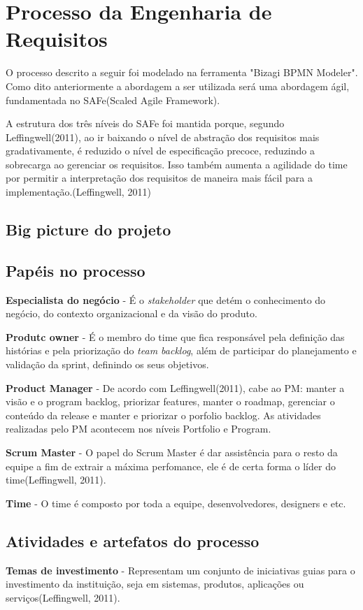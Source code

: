 \chapter[Processo da Engenharia de Requisitos]{Processo da Engenharia de Requisitos}
O processo descrito a seguir foi modelado na ferramenta "Bizagi BPMN Modeler". Como dito anteriormente a abordagem a ser utilizada será uma abordagem ágil, fundamentada no SAFe(Scaled Agile Framework).

A estrutura dos três níveis do SAFe foi mantida porque, segundo Leffingwell(2011), ao ir baixando o nível de abstração dos requisitos mais gradativamente, é reduzido o nível de especificação precoce, reduzindo a sobrecarga ao gerenciar os requisitos. Isso também aumenta a agilidade do time por permitir a interpretação dos requisitos de maneira mais fácil para a implementação.(Leffingwell, 2011)
\section{Big picture do projeto}
\section{Papéis no processo}
\textbf{Especialista do negócio} - É o \textit{stakeholder} que detém o conhecimento do negócio, do contexto organizacional e da visão do produto.

\textbf{Produtc owner} - É o membro do time que fica responsável pela definição das histórias e pela priorização do 
\textit{team backlog}, além de participar do planejamento e validação da sprint, definindo os seus objetivos.

\textbf{Product Manager} - De acordo com Leffingwell(2011), cabe ao PM: manter a visão e o program backlog, priorizar features, manter o roadmap, gerenciar o conteúdo da release e manter e priorizar o porfolio backlog. As atividades realizadas pelo PM acontecem nos níveis Portfolio e Program.

\textbf{Scrum Master} - O papel do Scrum Master é dar assistência para o resto da equipe a fim de extrair a máxima perfomance, ele é de certa forma o líder do time(Leffingwell, 2011).

\textbf{Time} - O time é composto por toda a equipe, desenvolvedores, designers e etc.
\section{Atividades e artefatos do processo}
\textbf{Temas de investimento} - Representam um conjunto de iniciativas guias para o investimento da instituição, seja em sistemas, produtos, aplicações ou serviços(Leffingwell, 2011).

